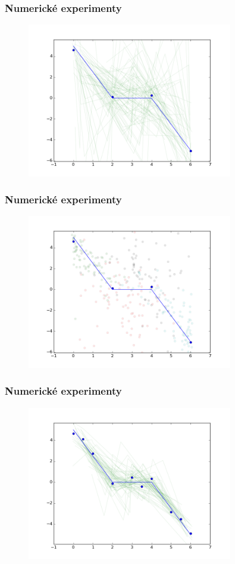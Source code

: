 \documentclass{beamer}
\begin{document}
\begin{frame}
\frametitle{Numerické experimenty}
\begin{figure}
	[H]\centering\includegraphics[width=0.8\textwidth]{images/prezentace1_lines.png}
\end{figure}
\end{frame}
\begin{frame}
\frametitle{Numerické experimenty}
\begin{figure}
	[H]\centering\includegraphics[width=0.8\textwidth]{images/prezentace1_hists.png}
\end{figure}
\end{frame}
\begin{frame}
\frametitle{Numerické experimenty}
\begin{figure}
	[H]\centering\includegraphics[width=0.8\textwidth]{images/prezentace2_lines.png}
\end{figure}
\end{frame}
\end{document}
